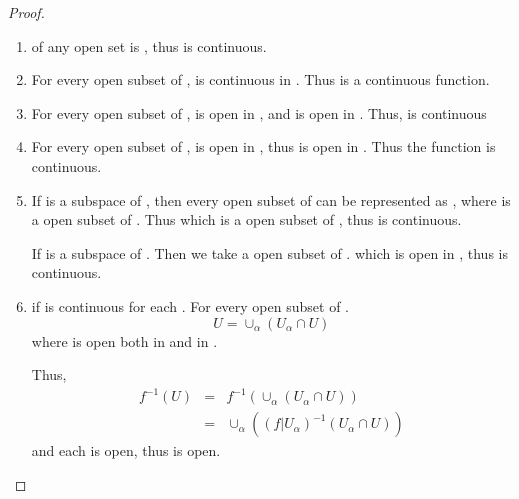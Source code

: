 \begin{proof}

      \hspace{1em}

      \begin{enumerate}
            \item {} of any open set  is , thus  is continuous.
            \item For every open subset  of ,  is continuous in . Thus  is a continuous function.
            \item For every open subset  of ,  is open in , and  is open in . Thus,  is continuous
            \item For every open subset  of ,  is open in , thus  is open in . Thus the function  is continuous.
            \item If  is a subspace of , then every open subset of  can be represented as , where  is a open subset of . Thus  which is a open subset of , thus  is continuous.
            
            If  is a subspace of . Then we take a open subset  of .  which is open in , thus  is continuous.

            \item if  is continuous for each \mt{\alpha}. For every open subset  of .
            \begin{equation*}
                  U = \cup_{\alpha} (U_{\alpha}\cap U)
            \end{equation*}
            where  is open both in  and in . 

            Thus,
            \begin{eqnarray*}
                  f^{-1}(U) &=& f^{-1}(\cup_{\alpha} (U_{\alpha}\cap U)) \\
                  &=& \cup_{\alpha} ((f|U_{\alpha})^{-1}(U_{\alpha}\cap U))
            \end{eqnarray*}
            and each  is open, thus  is open.
      \end{enumerate}
\end{proof}

